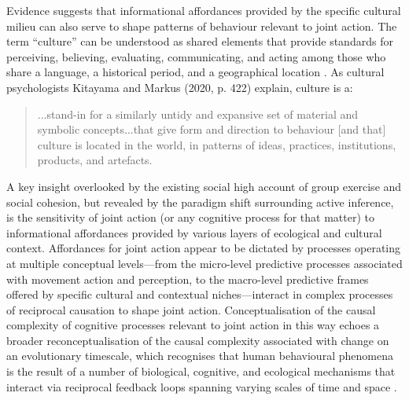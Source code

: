 \begin{CJK}{UTF8}{gbsn}
Evidence suggests that informational affordances provided by the specific cultural milieu can also serve to shape patterns of behaviour relevant to joint action.  The term ``culture'' can be understood as shared elements that provide standards for perceiving, believing, evaluating, communicating, and acting among those who share a language, a historical period, and a geographical location \citep{Triandis1996}.  As cultural psychologists Kitayama and Markus (2020, p. 422) explain, culture is a:

\begin{quote}
  ...stand-in for a similarly untidy and expansive set of material and symbolic concepts...that give form and direction to behaviour [and that] culture is located in the world, in patterns of ideas, practices, institutions, products, and artefacts.
\end{quote}

A key insight overlooked by the existing social high account of group exercise and social cohesion, but revealed by the paradigm shift surrounding active inference, is the sensitivity of joint action (or any cognitive process for that matter) to informational affordances provided by various layers of ecological and cultural context.  Affordances for joint action appear to be dictated by processes operating at multiple conceptual levels---from the micro-level predictive processes associated with movement action and perception, to the macro-level predictive frames offered by specific cultural and contextual niches---interact in complex processes of reciprocal causation to shape joint action.  Conceptualisation of the causal complexity of cognitive processes relevant to joint action in this way echoes a broader reconceptualisation of the causal complexity associated with change on an evolutionary timescale, which recognises that human behavioural phenomena is the result of a number of biological, cognitive, and ecological mechanisms that interact via reciprocal feedback loops spanning varying scales of time and space \citep{Fuentes2015}.


\end{CJK}
